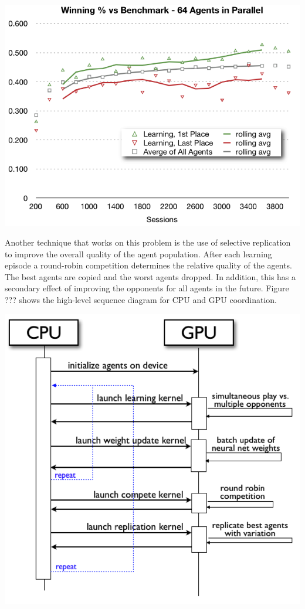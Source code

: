 \documentclass[11pt]{article} %
\begin{document}
\center
\includegraphics[scale=0.8]{fig18}
\begin{flushleft}


Another technique that works on this problem is the use of selective replication to improve the overall quality of the agent population.  After each learning episode a round-robin competition determines the relative quality of the agents.  The best agents are copied and the worst agents dropped.  In addition, this has a secondary effect of improving the opponents for all agents in the future.  Figure ??? shows the high-level sequence diagram for CPU and GPU coordination.

\end{flushleft}
\center
\includegraphics[scale=0.8]{fig19}
\end{document}

